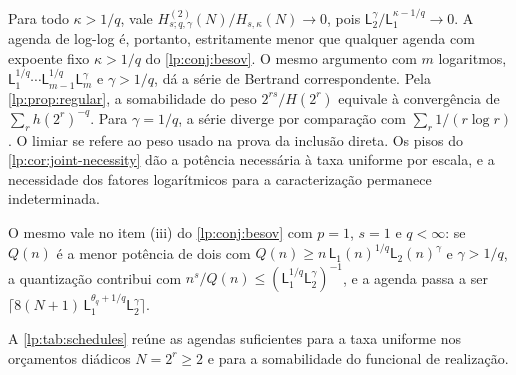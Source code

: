 \documentclass[12pt,a4paper]{article}
\begin{document}
\begin{observacao}
\label{lp:obs:loglog}
Para todo $\kappa>1/q$, vale $H^{(2)}_{s;q,\gamma}(N)/H_{s,\kappa}(N)\to0$, pois $\mathsf L_2^{\gamma}/\mathsf L_1^{\kappa-1/q}\to0$. A agenda de log-log é, portanto, estritamente menor que qualquer agenda com expoente fixo $\kappa>1/q$ do \cref{lp:conj:besov}. O mesmo argumento com $m$ logaritmos, $\mathsf L_1^{1/q}\cdots\mathsf L_{m-1}^{1/q}\mathsf L_m^{\gamma}$ e $\gamma>1/q$, dá a série de Bertrand correspondente. Pela \cref{lp:prop:regular}, a somabilidade do peso $2^{rs}/H(2^r)$ equivale à convergência de $\sum_rh(2^r)^{-q}$. Para $\gamma=1/q$, a série diverge por comparação com $\sum_r1/(r\log r)$. O limiar se refere ao peso usado na prova da inclusão direta. Os pisos do \cref{lp:cor:joint-necessity} dão a potência necessária à taxa uniforme por escala, e a necessidade dos fatores logarítmicos para a caracterização permanece indeterminada.

O mesmo vale no item (iii) do \cref{lp:conj:besov} com $p=1$, $s=1$ e $q<\infty$: se $Q(n)$ é a menor potência de dois com $Q(n)\ge n\,\mathsf L_1(n)^{1/q}\mathsf L_2(n)^{\gamma}$ e $\gamma>1/q$, a quantização contribui com $n^{s}/Q(n)\le(\mathsf L_1^{1/q}\mathsf L_2^{\gamma})^{-1}$, e a agenda passa a ser $\lceil8(N+1)\,\mathsf L_1^{\theta_q+1/q}\mathsf L_2^{\gamma}\rceil$.
\end{observacao}

A \cref{lp:tab:schedules} reúne as agendas suficientes para a taxa uniforme nos orçamentos diádicos $N=2^r\ge2$ e para a somabilidade do funcional de realização.
\end{document}
